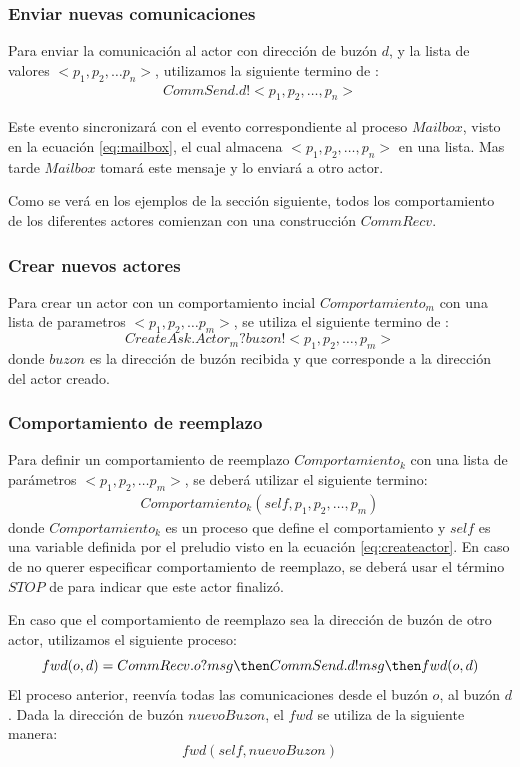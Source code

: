 \subsubsection*{Enviar nuevas comunicaciones}
 Para enviar la comunicación al actor con dirección de buzón $d$, y la lista de valores $<p_1, p_2, \ldots p_n>$, utilizamos la siguiente termino de \CSP:
\begin{align*}
CommSend.d!<p_1, p_2, \ldots, p_n> 
\end{align*}

Este evento sincronizará con el evento correspondiente al proceso $Mailbox$, visto en la ecuación \eqref{eq:mailbox}, el cual almacena $<p_1, p_2, \ldots, p_n>$ en una lista. Mas tarde $Mailbox$ tomará este mensaje y lo enviará a otro actor. 

Como se verá en los ejemplos de la sección siguiente, todos los comportamiento de los diferentes actores comienzan con una construcción $CommRecv$.

\subsubsection*{Crear nuevos actores}
Para crear un actor con un comportamiento incial $Comportamiento_m$ con una lista de parametros $<p_1, p_2, \ldots p_m>$, se utiliza el siguiente termino de \CSP: 
\begin{equation*}
CreateAsk.Actor_m?buzon!<p_1, p_2, \ldots, p_m> 
\end{equation*}	
donde $buzon$ es la dirección de buzón recibida y que corresponde a la dirección del actor creado.

\subsubsection*{Comportamiento de reemplazo}
Para definir un comportamiento de reemplazo $Comportamiento_k$ con una lista de parámetros $<p_1, p_2, \ldots p_m>$, se deberá utilizar el siguiente termino: 
\begin{align*}
Comportamiento_k(self, p_1, p_2, \ldots, p_m) 
\end{align*}	
donde $Comportamiento_k$ es un proceso \CSP que define el comportamiento y $self$ es una variable definida por el preludio visto en la ecuación \eqref{eq:createactor}.
En caso de no querer especificar comportamiento de reemplazo, se deberá usar el término $STOP$ de \CSP para indicar que este actor finalizó.

En caso que el comportamiento de reemplazo sea la dirección de buzón de otro actor, utilizamos   el siguiente proceso:
\begin{equation*}
  fwd(o, d) = CommRecv.o?msg \then CommSend.d!msg \then fwd(o, d)
\end{equation*}
El proceso anterior, reenvía todas las comunicaciones desde el buzón $o$, al buzón $d$. Dada la dirección de buzón $nuevoBuzon$, el $fwd$ se utiliza de la siguiente manera:
\begin{equation*}
  fwd(self, nuevoBuzon)
\end{equation*}


